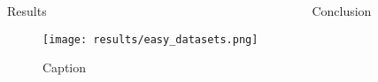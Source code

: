 \begin{frame}
\begin{columns}
{\begin{block}{Results}
\begin{figure}[h]
\centering
\texttt{[image: results/easy\_datasets.png]}
\caption{Caption}
\label{fig:svm_error}
\end{figure}

\end{block}



\begin{block}{Conclusion}%
{%

}%
\end{block}
}%
\end{columns}
\end{frame}

